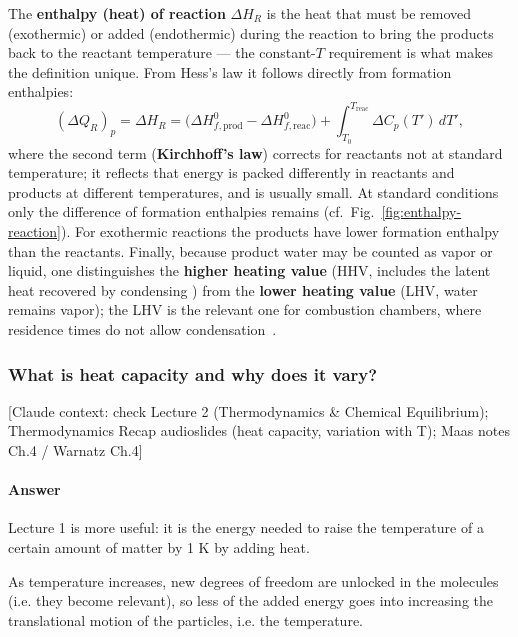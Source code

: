 {The \textbf{enthalpy (heat) of reaction} $\Delta H_R$ is the heat that must be removed (exothermic) or added (endothermic) during the reaction to bring the products back to the reactant temperature --- the constant-$T$ requirement is what makes the definition unique. From Hess's law it follows directly from formation enthalpies:
\begin{equation*}
(\Delta Q_R)_p = \Delta H_R = \big(\Delta H_{f,\mathrm{prod}}^0 - \Delta H_{f,\mathrm{reac}}^0\big) + \int_{T_0}^{T_{\mathrm{reac}}} \Delta C_p(T')\,dT',
\end{equation*}
where the second term (\textbf{Kirchhoff's law}) corrects for reactants not at standard temperature; it reflects that energy is packed differently in reactants and products at different temperatures, and is usually small. At standard conditions only the difference of formation enthalpies remains (cf.\ Fig.~\ref{fig:enthalpy-reaction}). For exothermic reactions the products have lower formation enthalpy than the reactants. Finally, because product water may be counted as vapor or liquid, one distinguishes the \textbf{higher heating value} (HHV, includes the latent heat recovered by condensing ) from the \textbf{lower heating value} (LHV, water remains vapor); the LHV is the relevant one for combustion chambers, where residence times do not allow condensation~\cite{Langella_LectureNotes,glassman2014combustion}.
}


\subsubsection{What is heat capacity and why does it vary?}

{\color{gray}\footnotesize [Claude context: check Lecture 2 (Thermodynamics \& Chemical Equilibrium); Thermodynamics Recap audioslides (heat capacity, variation with T); Maas notes Ch.4 / Warnatz Ch.4]}

\paragraph{Answer}

Lecture 1 is more useful: it is the energy needed to raise the temperature of a certain amount of matter by 1 K by adding heat.

As temperature increases, new degrees of freedom are unlocked in the molecules (i.e. they become relevant), so less of the added energy goes into increasing the translational motion of the particles, i.e. the temperature.

